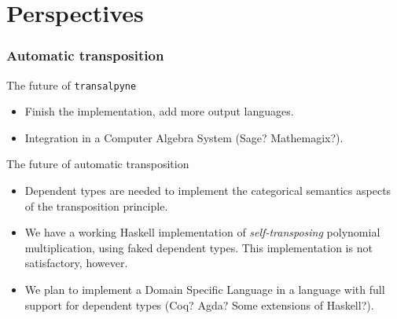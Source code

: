 \documentclass[10pt,usepdftitle=false]{beamer}
\begin{document}

\section{Perspectives}

\begin{frame}
  \frametitle{Automatic transposition}
  
  \begin{block}{The future of \texttt{transalpyne}}
    \begin{itemize}
    \item Finish the implementation, add more output languages.
    \item Integration in a Computer Algebra System (Sage?
      Mathemagix?).
    \end{itemize}
  \end{block}
  
  \begin{block}{The future of automatic transposition}
    \begin{itemize}
    \item Dependent types are needed to implement the categorical
      semantics aspects of the transposition principle.
    \item We have a working Haskell implementation of
      \textit{self-transposing} polynomial multiplication, using faked
      dependent types. This implementation is not satisfactory, however.
    \item We plan to implement a Domain Specific Language in a
      language with full support for dependent types (Coq? Agda? Some
      extensions of Haskell?).
    \end{itemize}
  \end{block}  
\end{frame}

\end{document}
